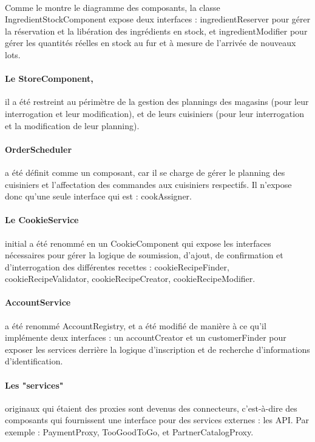 \paragraph{}Comme le montre le diagramme des composants, la classe IngredientStockComponent expose deux interfaces : ingredientReserver pour gérer la réservation et la libération des ingrédients en stock, et ingredientModifier pour gérer les quantités réelles en stock au fur et à mesure de l'arrivée de nouveaux lots. 

\paragraph{Le StoreComponent,} il a été restreint au périmètre de la gestion des plannings des magasins (pour leur interrogation et leur modification), et de leurs cuisiniers (pour leur interrogation et la modification de leur planning). 
\paragraph{OrderScheduler} a été définit comme un composant, car il se charge de gérer le planning des cuisiniers et l'affectation des commandes aux cuisiniers respectifs.  Il n'expose donc qu'une seule interface qui est : cookAssigner. 
\paragraph{Le CookieService} initial a été renommé en un CookieComponent qui expose les interfaces nécessaires pour gérer la logique de soumission, d'ajout, de confirmation et d'interrogation des différentes recettes : cookieRecipeFinder, cookieRecipeValidator, cookieRecipeCreator, cookieRecipeModifier.
\paragraph{AccountService} a été renommé AccountRegistry, et a été modifié de manière à ce qu'il implémente deux interfaces : un accountCreator et un customerFinder pour exposer les services derrière la logique d'inscription et de recherche d'informations d'identification.
\paragraph{Les "services"} originaux qui étaient des proxies sont devenus des connecteurs, c'est-à-dire des composants qui fournissent une interface pour des services externes : les API. Par exemple : PaymentProxy, TooGoodToGo, et PartnerCatalogProxy.

